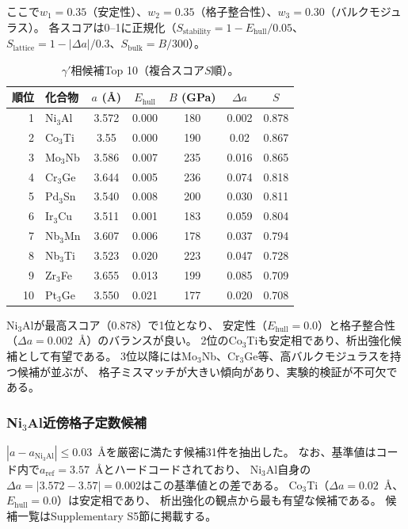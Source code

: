 \documentclass[5p,twocolumn]{elsarticle}
\begin{document}
ここで$w_1 = 0.35$（安定性）、$w_2 = 0.35$（格子整合性）、$w_3 = 0.30$（バルクモジュラス）。
各スコアは0--1に正規化（$S_\text{stability} = 1 - E_\text{hull}/0.05$、
$S_\text{lattice} = 1 - |\Delta a|/0.3$、$S_\text{bulk} = B/300$）。

\begin{table}[htbp]
  \centering
  \caption{$\gamma'$相候補Top 10（複合スコア$S$順）。}
  \label{tab:gamma_prime}
  \small
  \begin{tabular}{rlccccc}
    \toprule
    順位 & 化合物 & $a$ (\AA) & $E_\text{hull}$ & $B$ (GPa) & $\Delta a$ & $S$ \\
    \midrule
    1 & Ni$_3$Al & 3.572 & 0.000 & 180 & 0.002 & 0.878 \\
    2 & Co$_3$Ti & 3.55 & 0.000 & 190 & 0.02 & 0.867 \\
    3 & Mo$_3$Nb & 3.586 & 0.007 & 235 & 0.016 & 0.865 \\
    4 & Cr$_3$Ge & 3.644 & 0.005 & 236 & 0.074 & 0.818 \\
    5 & Pd$_3$Sn & 3.540 & 0.008 & 200 & 0.030 & 0.811 \\
    6 & Ir$_3$Cu & 3.511 & 0.001 & 183 & 0.059 & 0.804 \\
    7 & Nb$_3$Mn & 3.607 & 0.006 & 178 & 0.037 & 0.794 \\
    8 & Nb$_3$Ti & 3.523 & 0.020 & 223 & 0.047 & 0.728 \\
    9 & Zr$_3$Fe & 3.655 & 0.013 & 199 & 0.085 & 0.709 \\
    10 & Pt$_3$Ge & 3.550 & 0.021 & 177 & 0.020 & 0.708 \\
    \bottomrule
  \end{tabular}
\end{table}

Ni$_3$Alが最高スコア（0.878）で1位となり、
安定性（$E_\text{hull} = 0.0$）と格子整合性（$\Delta a = 0.002$~\AA）のバランスが良い。
2位のCo$_3$Tiも安定相であり、析出強化候補として有望である。
3位以降にはMo$_3$Nb、Cr$_3$Ge等、高バルクモジュラスを持つ候補が並ぶが、
格子ミスマッチが大きい傾向があり、実験的検証が不可欠である。

\subsubsection{Ni$_3$Al近傍格子定数候補}

$|a - a_{\text{Ni}_3\text{Al}}| \leq 0.03$~\AA を厳密に満たす候補31件を抽出した。
なお、基準値はコード内で$a_{\text{ref}} = 3.57$~\AA{}とハードコードされており、
Ni$_3$Al自身の$\Delta a = |3.572 - 3.57| = 0.002$はこの基準値との差である。
Co$_3$Ti（$\Delta a = 0.02$~\AA、$E_\text{hull} = 0.0$）は安定相であり、
析出強化の観点から最も有望な候補である。
候補一覧はSupplementary S5節に掲載する。
\end{document}
